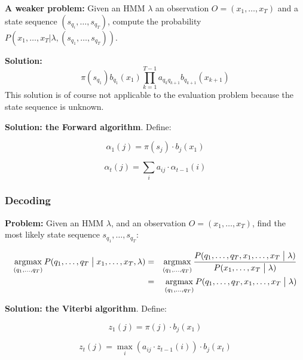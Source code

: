 \documentclass[11pt]{article}
\DeclareMathOperator*{\argmax}{\arg\!\max}
\begin{document}
\textbf{A weaker problem:} Given an HMM $\lambda$ an observation $O = (x_1, \ldots, x_T)$ and a state sequence $(s_{q_i}, \ldots, s_{q_T})$, compute the probability $P(x_1, \ldots, x_T | \lambda, (s_{q_1}, \ldots, s_{q_T}))$.

\vspace{5pt}

\textbf{Solution:}
\begin{equation}
    \pi(s_{q_1}) b_{q_1}(x_1) \prod\limits_{k = 1}^{T - 1} a_{q_{k}q_{k+1}} b_{q_{k+1}}(x_{k+1})
\end{equation}
This solution is of course not applicable to the evaluation problem because the state sequence is unknown.

\vspace{10pt}

\textbf{Solution: the Forward algorithm}. Define:

\begin{equation}
    \alpha_1(j) = \pi(s_j) \cdot b_j(x_1)
\end{equation}

\begin{equation}
    \alpha_t(j) = \sum\limits_i a_{ij} \cdot \alpha_{t-1}(i)
\end{equation}

\subsubsection{Decoding}

\textbf{Problem:} Given an HMM $\lambda$, and an observation $O = (x_1, \ldots, x_T)$, find the most likely state sequence $s_{q_1}, \ldots, s_{q_T}$:

\begin{eqnarray*}
    \argmax_{(q_1, \ldots, q_T)} P(q_1, \ldots, q_T \bigm| x_1, \ldots, x_T, \lambda)
    &=& \argmax_{(q_1, \ldots, q_T)} \frac{P(q_1, \ldots, q_T, x_1, \ldots, x_T \bigm| \lambda)}{P(x_1, \ldots, x_T \bigm| \lambda)} \\
    &=& \argmax_{(q_1, \ldots, q_T)} P(q_1, \ldots, q_T, x_1, \ldots, x_T \bigm| \lambda)
\end{eqnarray*}

\textbf{Solution: the Viterbi algorithm}. Define:

\begin{equation}
    z_1(j) = \pi(j) \cdot b_j(x_1)
\end{equation}

\begin{equation}
    z_t(j) = \max_i(a_{ij} \cdot z_{t-1}(i)) \cdot b_j(x_t)
\end{equation}
\end{document}
